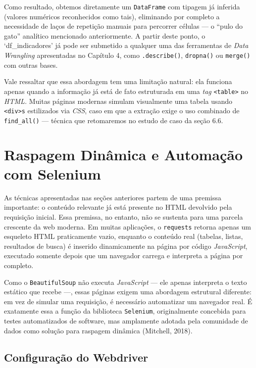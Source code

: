 \documentclass[
  brazilian,
  letterpaper,
  DIV=11,
  numbers=noendperiod]{scrreprt}
\begin{document}
Como resultado, obtemos diretamente um \texttt{DataFrame} com tipagem já
inferida (valores numéricos reconhecidos como tais), eliminando por
completo a necessidade de laços de repetição manuais para percorrer
células --- o ``pulo do gato'' analítico mencionado anteriormente. A
partir deste ponto, o `df\_indicadores' já pode ser submetido a qualquer
uma das ferramentas de \emph{Data Wrangling} apresentadas no Capítulo 4,
como \texttt{.describe()}, \texttt{dropna()} ou \texttt{merge()} com
outras bases.

Vale ressaltar que essa abordagem tem uma limitação natural: ela
funciona apenas quando a informação já está de fato estruturada em uma
\emph{tag} \texttt{\textless{}table\textgreater{}} no \emph{HTML.}
Muitas páginas modernas simulam visualmente uma tabela usando
\texttt{\textless{}div\textgreater{}s} estilizados via \emph{CSS}, caso
em que a extração exige o uso combinado de \texttt{find\_all()} ---
técnica que retomaremos no estudo de caso da seção 6.6.

\section{Raspagem Dinâmica e Automação com
Selenium}\label{raspagem-dinuxe2mica-e-automauxe7uxe3o-com-selenium}

As técnicas apresentadas nas seções anteriores partem de uma premissa
importante: o conteúdo relevante já está presente no HTML devolvido pela
requisição inicial. Essa premissa, no entanto, não se sustenta para uma
parcela crescente da web moderna. Em muitas aplicações, o
\texttt{requests} retorna apenas um esqueleto HTML praticamente vazio,
enquanto o conteúdo real (tabelas, listas, resultados de busca) é
inserido dinamicamente na página por código \emph{JavaScript}, executado
somente depois que um navegador carrega e interpreta a página por
completo.

Como o \texttt{BeautifulSoup} não executa \emph{JavaScript} --- ele
apenas interpreta o texto estático que recebe ---, essas páginas exigem
uma abordagem estrutural diferente: em vez de simular uma requisição, é
necessário automatizar um navegador real. É exatamente essa a função da
biblioteca \texttt{Selenium}, originalmente concebida para testes
automatizados de software, mas amplamente adotada pela comunidade de
dados como solução para raspagem dinâmica (Mitchell, 2018).

\subsection{Configuração do
Webdriver}\label{configurauxe7uxe3o-do-webdriver}
\end{document}
